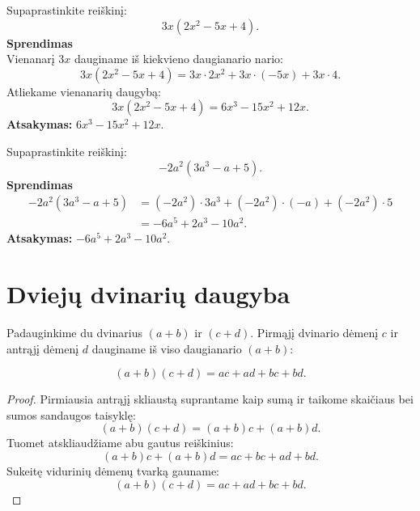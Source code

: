\documentclass[11pt,a4paper]{scrartcl}
\begin{document}
\begin{example}
Supaprastinkite reiškinį:
\[
3x(2x^2-5x+4).
\]
\textbf{Sprendimas}\\
Vienanarį $3x$ dauginame iš kiekvieno daugianario nario:
\[
3x(2x^2-5x+4)=3x\cdot2x^2+3x\cdot(-5x)+3x\cdot4.
\]
Atliekame vienanarių daugybą:
\[
3x(2x^2-5x+4)=6x^3-15x^2+12x.
\]
\textbf{Atsakymas:} $6x^3-15x^2+12x$.
\end{example}

\begin{example}
Supaprastinkite reiškinį:
\[
-2a^2(3a^3-a+5).
\]
\textbf{Sprendimas}\\
\[
\begin{aligned}
-2a^2(3a^3-a+5)
&=(-2a^2)\cdot3a^3+(-2a^2)\cdot(-a)+(-2a^2)\cdot5 \\
&=-6a^5+2a^3-10a^2.
\end{aligned}
\]
\textbf{Atsakymas:} $-6a^5+2a^3-10a^2$.
\end{example}

\section{Dviejų dvinarių daugyba}

Padauginkime du dvinarius $(a+b)$ ir $(c+d)$. Pirmąjį dvinario dėmenį $c$ ir antrąjį dėmenį $d$ dauginame iš viso daugianario $(a+b)$:

\begin{property}
\[
(a+b)(c+d)=ac+ad+bc+bd.
\]
\end{property}

\begin{proof}
Pirmiausia antrąjį skliaustą suprantame kaip sumą ir taikome skaičiaus bei sumos sandaugos taisyklę:
\[
(a+b)(c+d)=(a+b)c+(a+b)d.
\]
Tuomet atskliaudžiame abu gautus reiškinius:
\[
(a+b)c+(a+b)d=ac+bc+ad+bd.
\]
Sukeitę vidurinių dėmenų tvarką gauname:
\[
(a+b)(c+d)=ac+ad+bc+bd.
\]
\end{proof}
\end{document}
